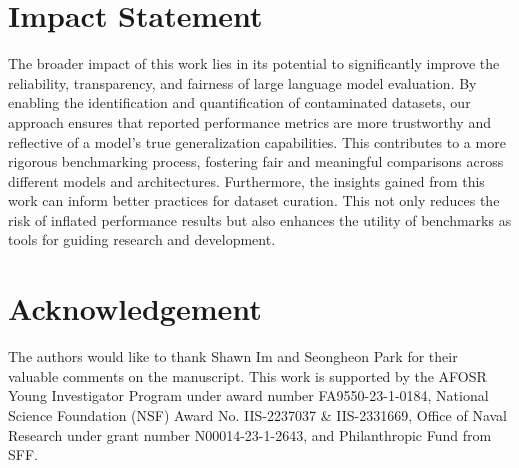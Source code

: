 \section*{Impact Statement}
The broader impact of this work lies in its potential to significantly improve the reliability, transparency, and fairness of large language model evaluation. By enabling the identification and quantification of contaminated datasets, our approach ensures that reported performance metrics are more trustworthy and reflective of a model's true generalization capabilities. This contributes to a more rigorous benchmarking process, fostering fair and meaningful comparisons across different models and architectures.
Furthermore, the insights gained from this work can inform better practices for dataset curation. This not only reduces the risk of inflated performance results but also enhances the utility of benchmarks as tools for guiding research and development.




\section*{Acknowledgement}
The authors would like to thank Shawn Im and Seongheon Park for their valuable comments on the manuscript. This work is supported by the AFOSR Young Investigator Program under award number FA9550-23-1-0184, National Science Foundation (NSF) Award No. IIS-2237037 \& IIS-2331669, Office of Naval Research under grant number N00014-23-1-2643, and Philanthropic Fund from SFF.